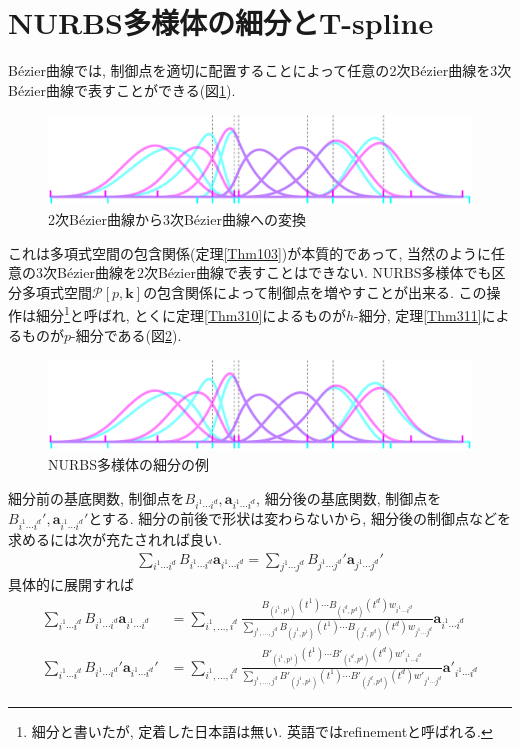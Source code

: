 \documentclass{jsarticle}
\theoremstyle{definition}%
\begin{document}
\section{NURBS多様体の細分とT-spline}
B\'{e}zier曲線では, 制御点を適切に配置することによって任意の$2$次B\'{e}zier曲線を$3$次B\'{e}zier曲線で表すことができる(図\ref{Fig601}).
\begin{figure}[H]
	\centering
    \includegraphics[page=3,clip,width=150mm]{figA.pdf}
    \caption{2次B\'{e}zier曲線から$3$次B\'{e}zier曲線への変換}
	\label{Fig601}
\end{figure}
これは多項式空間の包含関係(定理\ref{Thm103})が本質的であって, 当然のように任意の$3$次B\'{e}zier曲線を$2$次B\'{e}zier曲線で表すことはできない.
NURBS多様体でも区分多項式空間$\mathcal{P}[p,\bm{k}]$の包含関係によって制御点を増やすことが出来る.
この操作は細分\footnote{細分と書いたが, 定着した日本語は無い. 英語ではrefinementと呼ばれる.}と呼ばれ, とくに定理\ref{Thm310}によるものが$h$-細分, 定理\ref{Thm311}によるものが$p$-細分である(図\ref{Fig602}).
\begin{figure}[H]
	\centering
    \includegraphics[page=11,clip,width=150mm]{figA.pdf}
    \caption{NURBS多様体の細分の例}
	\label{Fig602}
\end{figure}
細分前の基底関数, 制御点を$B_{i^1\cdots i^d}, \bm{a}_{i^1\cdots i^d}$, 細分後の基底関数, 制御点を$B_{i^1\cdots i^d}', \bm{a}_{i^1\cdots i^d}'$とする.
細分の前後で形状は変わらないから, 細分後の制御点などを求めるには次が充たされれば良い.
\begin{align}
    \sum_{i^1\cdots i^d} B_{i^1\cdots i^d}\bm{a}_{i^1\cdots i^d}
    =\sum_{j^1\cdots j^d} B_{j^1\cdots j^d}'\bm{a}_{j^1\cdots j^d}'
\end{align}
具体的に展開すれば
\begin{align}
    \sum_{i^1\cdots i^d} B_{i^1\cdots i^d}\bm{a}_{i^1\cdots i^d}
    &=\sum_{i^1,\dots,i^d} \frac{B_{(i^1,p^1)}(t^1)\cdots B_{(i^d,p^d)}(t^d)w_{i^1\cdots i^d}}{\sum\limits_{j^1,\dots,j^d}B_{(j^1,p^1)}(t^1)\cdots B_{(j^d,p^d)}(t^d)w_{j^1\cdots j^d}}\bm{a}_{i^1\cdots i^d} \\
    \sum_{i^1\cdots i^d} B_{i^1\cdots i^d}'\bm{a}_{i^1\cdots i^d}'
    &=\sum_{i^1,\dots,i^d} \frac{B'_{(i^1,p^1)}(t^1)\cdots B'_{(i^d,p^d)}(t^d)w'_{i^1\cdots i^d}}{\sum\limits_{j^1,\dots,j^d}B'_{(j^1,p^1)}(t^1)\cdots B'_{(j^d,p^d)}(t^d)w'_{j^1\cdots j^d}}\bm{a}'_{i^1\cdots i^d}
\end{align}
\end{document}
